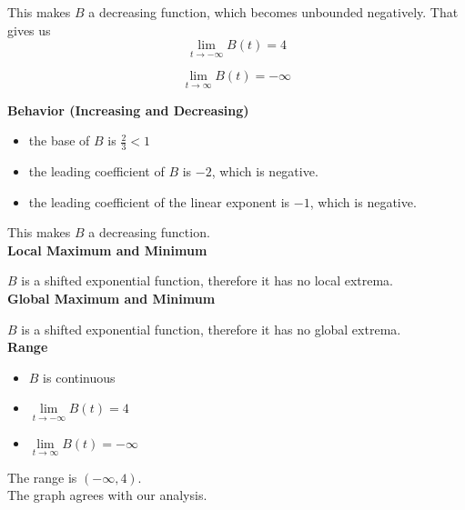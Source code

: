 \documentclass{ximera}
\begin{document}
\begin{example}
This makes $B$ a decreasing function, which becomes unbounded negatively.  That gives us \\


\[ \lim\limits_{t \to -\infty} B(t) = 4 \]

\[ \lim\limits_{t \to \infty} B(t) = -\infty \]




\textbf{Behavior (Increasing and  Decreasing)} \\


\begin{itemize}
  \item the base of $B$ is $\frac{2}{3} < 1$
  \item the leading coefficient of $B$ is $-2$, which is negative.
  \item the leading coefficient of the linear exponent is $-1$, which is negative.
\end{itemize}


This makes $B$ a decreasing function. \\ 






\textbf{Local Maximum and Minimum}

$B$ is a shifted exponential function, therefore it has no local extrema. \\





\textbf{Global Maximum and Minimum}

$B$ is a shifted exponential function, therefore it has no global extrema. \\





\textbf{Range}

 
\begin{itemize}
\item $B$ is continuous
\item $\lim\limits_{t \to -\infty} B(t) = 4$
\item $\lim\limits_{t \to \infty} B(t) = -\infty$
\end{itemize}


The range is $(-\infty, 4)$. \\





The graph agrees with our analysis. \\



\end{example}
\end{document}
